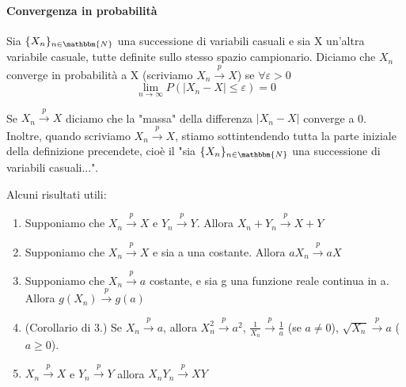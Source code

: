 \paragraph{Convergenza in probabilità}
\begin{definizione}

Sia $\{X_n\}_{n\in\mathbbm{N}}$ una successione di variabili casuali e 
sia X un'altra variabile casuale, tutte definite sullo stesso spazio campionario.
Diciamo che $X_n$ converge in probabilità a X (scriviamo $X_n\stackrel{p}{\rightarrow}X$) se $\forall\varepsilon>0$ $$\lim_{n \rightarrow\infty} P(|X_n-X|\leq\varepsilon)=0$$
\end{definizione}
\begin{oss}
Se $X_n\stackrel{p}{\rightarrow}X$ diciamo che la "massa" della differenza $|X_n-X|$ converge a 0.
Inoltre, quando scriviamo $X_n\stackrel{p}{\rightarrow}X$, stiamo sottintendendo tutta la parte iniziale della definizione precendete, cioè il "sia $\{X_n\}_{n\in\mathbbm{N}}$ una successione di variabili casuali...".
\end{oss}
\begin{teo} Alcuni risultati utili: 

\begin{enumerate}
\item Supponiamo che  $X_n\stackrel{p}{\rightarrow}X$ e  $Y_n\stackrel{p}{\rightarrow}Y$. Allora  $X_n+Y_n\stackrel{p}{\rightarrow}X+Y$
\item Supponiamo che $X_n\stackrel{p}{\rightarrow}X$ e sia a una costante. Allora $aX_n\stackrel{p}{\rightarrow}aX$ 
\item Supponiamo che  $X_n\stackrel{p}{\rightarrow}a$ costante, e sia g una funzione reale continua in a. Allora  $g(X_n)\stackrel{p}{\rightarrow}g(a)$
\item (Corollario di 3.) Se $X_n\stackrel{p}{\rightarrow}a$, allora $X_n^2\stackrel{p}{\rightarrow}a^2$, $\frac{1}{X_n}\stackrel{p}{\rightarrow}\frac{1}{a}$ (se $a\neq0$), $\sqrt{X_n}\stackrel{p}{\rightarrow}{a}$ ($a\geq0$).
\item $X_n\stackrel{p}{\rightarrow}X$ e $Y_n\stackrel{p}{\rightarrow}Y$ allora $X_nY_n\stackrel{p}{\rightarrow}XY$
\end{enumerate}
\end{teo}
